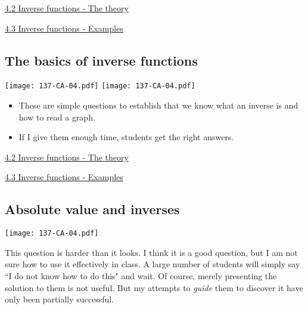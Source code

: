 \documentclass[11pt]{article}
\newcommand{\nl}{\hfill \vspace{-1.1\baselineskip}} %
\newcommand{\vii}{\hspace{8mm} \href{https://www.youtube.com/watch?v=DxecWsEms_c&list=PLlwePzQY_wW-EDeUZebRoA8HGoeZxxpEU&index=2}{4.2 Inverse functions - The theory}}
\newcommand{\viii}{\hspace{8mm} \href{https://www.youtube.com/watch?v=bnsVbyLUZqs&list=PLlwePzQY_wW-EDeUZebRoA8HGoeZxxpEU&index=3}{4.3 Inverse functions - Examples}}
\begin{document}
\begin{videos}
\vii

\viii
\end{videos}

\newpage
\subsection{The basics of inverse functions} 

\begin{center}
{ \texttt{[image: 137-CA-04.pdf]}} \quad
{ \texttt{[image: 137-CA-04.pdf]}}
\end{center}


\begin{comments}
\nl
\begin{itemize}
	\item These are simple questions to establish that we know what an inverse is and how to read a graph.   
	\item If I give them enough time, students get the right answers.
\end{itemize}	
\end{comments}

\begin{videos}
\vii

\viii
\end{videos}

\newpage
\subsection{Absolute value and inverses} 

\begin{center}
{ \texttt{[image: 137-CA-04.pdf]}} 
\end{center}

\vspace{-11mm}

\begin{warning}
 This question is harder than it looks.    I think it is a good question, but I am not sure how to use it effectively in class.  A large number of students will simply say ``I do not know how to do this" and wait.  Of course, merely presenting the solution to them is not useful.  But my attempts to \emph{guide} them to discover it have only been partially successful.
\end{warning}

\vspace{-1mm}
\end{document}
